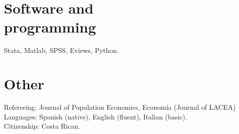 \documentclass[margin]{res} %
\begin{document}
\begin{resume}
\section{Software and \\ programming}
Stata, Matlab, SPSS, Eviews, Python. \\

\section{Other}
Refereeing: Journal of Population Economics, Econom\'ia (Journal of LACEA) \\
Languages: Spanish (native), English (fluent), Italian (basic). \\
Citizenship: Costa Rican.





\end{resume}
\end{document}
